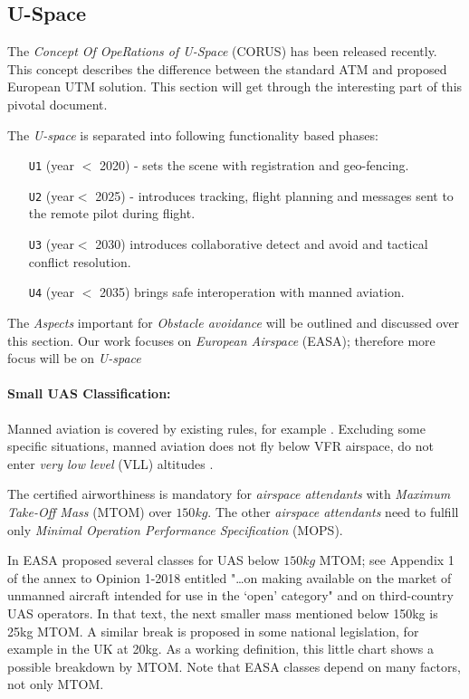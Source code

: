 \subsection{U-Space}\label{sec:USpace}

\noindent The \emph{Concept Of OpeRations of U-Space} (CORUS) \cite{corus2018} has been released recently. This concept describes the difference between the standard ATM and proposed European UTM solution. This section will get through the interesting part of this pivotal document.

\newpage\noindent The \emph{U-space} is separated into following functionality based phases:
\begin{itemize}
    \item[\texttt{U1}] (year $<$ 2020) - sets the scene with registration and geo-fencing.
    
    \item[\texttt{U2}] (year$<$ 2025) - introduces tracking, flight planning and messages sent to the remote pilot during flight.
    
    \item[\texttt{U3}] (year$<$ 2030) introduces collaborative detect and avoid and tactical conflict resolution.
    
    \item[\texttt{U4}] (year $<$ 2035) brings safe interoperation with manned aviation.
\end{itemize}

The \emph{Aspects} important for \emph{Obstacle avoidance} will be outlined and discussed over this section. Our work focuses on \emph{European Airspace} (EASA); therefore more focus will be on \emph{U-space}

\paragraph{Small UAS Classification:} Manned aviation is covered by existing rules, for example \cite{icaoAnnex2,ec201208ref5}. Excluding some specific situations, manned aviation does not fly below VFR airspace, do not enter \emph{very low level} (VLL) altitudes \cite{ec200802ref4}. 

The certified airworthiness is mandatory for \emph{airspace attendants} with \emph{Maximum Take-Off Mass} (MTOM) over $150 kg$. The other \emph{airspace attendants} need to fulfill only \emph{Minimal Operation Performance Specification} (MOPS). 

In \cite{easa201801op} EASA proposed several classes for UAS below $150kg$ MTOM; see Appendix 1 of the annex to Opinion 1-2018 entitled "…on making available on the market of unmanned aircraft intended for use in the ‘open’ category" and on third-country UAS operators. In that text, the next smaller mass mentioned below 150kg is 25kg MTOM. A similar break is proposed in some national legislation, for example in the UK at 20kg. As a working definition, this little chart shows a possible breakdown by MTOM. Note
that EASA classes depend on many factors, not only MTOM.

